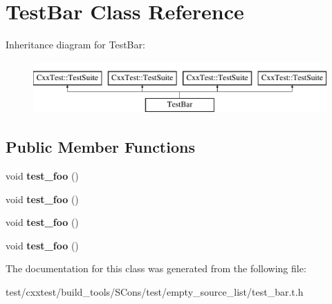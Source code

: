 \hypertarget{classTestBar}{\section{Test\-Bar Class Reference}
\label{classTestBar}
}
Inheritance diagram for Test\-Bar\-:\begin{figure}[H]
\begin{center}
\leavevmode
\includegraphics[height=2.000000cm]{classTestBar}
\end{center}
\end{figure}
\subsection*{Public Member Functions}
\begin{DoxyCompactItemize}
\item 
\hypertarget{classTestBar_ab2ab60344938f779169658ea0924d9ba}{void {\bfseries test\-\_\-foo} ()}\label{classTestBar_ab2ab60344938f779169658ea0924d9ba}

\item 
\hypertarget{classTestBar_ab2ab60344938f779169658ea0924d9ba}{void {\bfseries test\-\_\-foo} ()}\label{classTestBar_ab2ab60344938f779169658ea0924d9ba}

\item 
\hypertarget{classTestBar_ab2ab60344938f779169658ea0924d9ba}{void {\bfseries test\-\_\-foo} ()}\label{classTestBar_ab2ab60344938f779169658ea0924d9ba}

\item 
\hypertarget{classTestBar_ab2ab60344938f779169658ea0924d9ba}{void {\bfseries test\-\_\-foo} ()}\label{classTestBar_ab2ab60344938f779169658ea0924d9ba}

\end{DoxyCompactItemize}


The documentation for this class was generated from the following file\-:\begin{DoxyCompactItemize}
\item 
test/cxxtest/build\-\_\-tools/\-S\-Cons/test/empty\-\_\-source\-\_\-list/test\-\_\-bar.\-t.\-h\end{DoxyCompactItemize}
